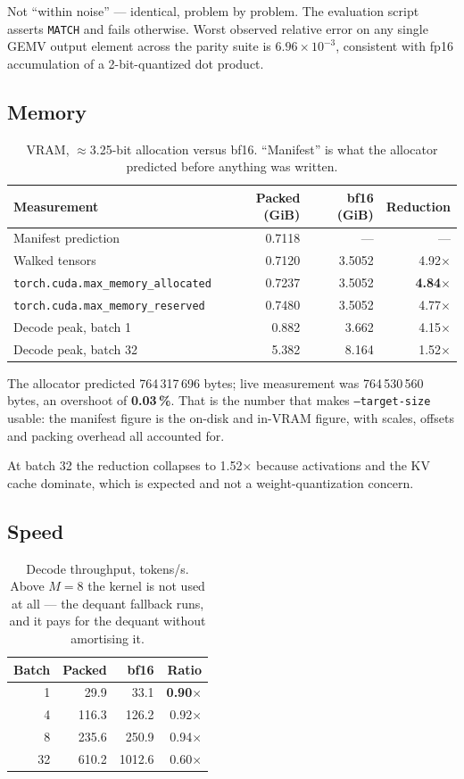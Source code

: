 \documentclass[11pt]{article}
\newcommand{\x}{$\times$}
\newcommand{\pct}{\,\%}
\newcommand{\code}[1]{\texttt{#1}}
\begin{document}
Not ``within noise'' --- identical, problem by problem. The evaluation script asserts
\code{MATCH} and fails otherwise. Worst observed relative error on any single GEMV output element
across the parity suite is $6.96\times10^{-3}$, consistent with fp16 accumulation of a
2-bit-quantized dot product.

\subsection{Memory}

\begin{table}[H]
\centering\small
\caption{VRAM, $\approx$3.25-bit allocation versus bf16. ``Manifest'' is what the allocator
predicted before anything was written.}
\begin{tabular}{lrrr}
\toprule
Measurement & Packed (GiB) & bf16 (GiB) & Reduction \\
\midrule
Manifest prediction & 0.7118 & --- & --- \\
\rowcolor{rowtint}
Walked tensors & 0.7120 & 3.5052 & 4.92\x \\
\code{torch.cuda.max\_memory\_allocated} & 0.7237 & 3.5052 & \textbf{4.84\x} \\
\rowcolor{rowtint}
\code{torch.cuda.max\_memory\_reserved} & 0.7480 & 3.5052 & 4.77\x \\
Decode peak, batch 1 & 0.882 & 3.662 & 4.15\x \\
\rowcolor{rowtint}
Decode peak, batch 32 & 5.382 & 8.164 & 1.52\x \\
\bottomrule
\end{tabular}
\end{table}

The allocator predicted 764\,317\,696 bytes; live measurement was 764\,530\,560 bytes, an
overshoot of \textbf{0.03\pct}. That is the number that makes \code{--target-size} usable: the
manifest figure is the on-disk and in-VRAM figure, with scales, offsets and packing overhead all
accounted for.

At batch 32 the reduction collapses to 1.52\x{} because activations and the KV cache dominate,
which is expected and not a weight-quantization concern.

\subsection{Speed}

\begin{table}[H]
\centering\small
\caption{Decode throughput, tokens/s. Above $M = 8$ the kernel is not used at all --- the
dequant fallback runs, and it pays for the dequant without amortising it.}
\begin{tabular}{rrrr}
\toprule
Batch & Packed & bf16 & Ratio \\
\midrule
1 & 29.9 & 33.1 & \textbf{0.90\x} \\
\rowcolor{rowtint}
4 & 116.3 & 126.2 & 0.92\x \\
8 & 235.6 & 250.9 & 0.94\x \\
\rowcolor{rowtint}
32 & 610.2 & 1012.6 & 0.60\x \\
\bottomrule
\end{tabular}
\end{table}
\end{document}
